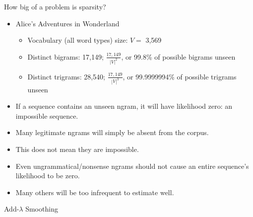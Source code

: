 \documentclass[11pt,letterpaper]{article}
\begin{document}
How big of a problem is sparsity?

\begin{itemize}
  \item Alice's Adventures in Wonderland
    \begin{itemize}
      \item Vocabulary (all word types) size: $V=$ 3,569
      \item Distinct bigrams:  17,149; $\frac{17,149}{|V|^2}$, or 99.8\% of possible bigrams unseen
      \item Distinct trigrams: 28,540; $\frac{17,149}{|V|^3}$, or 99.9999994\% of possible trigrams unseen
    \end{itemize}
  \item If a sequence contains an unseen ngram, it will have likelihood zero: an impossible sequence.
  \item Many legitimate ngrams will simply be absent from the corpus.
  \item This does not mean they are impossible.
  \item Even ungrammatical/nonsense ngrams should not cause an entire sequence's likelihood to be zero.
  \item Many others will be too infrequent to estimate well.
\end{itemize}


Add-$\lambda$ Smoothing
\end{document}
